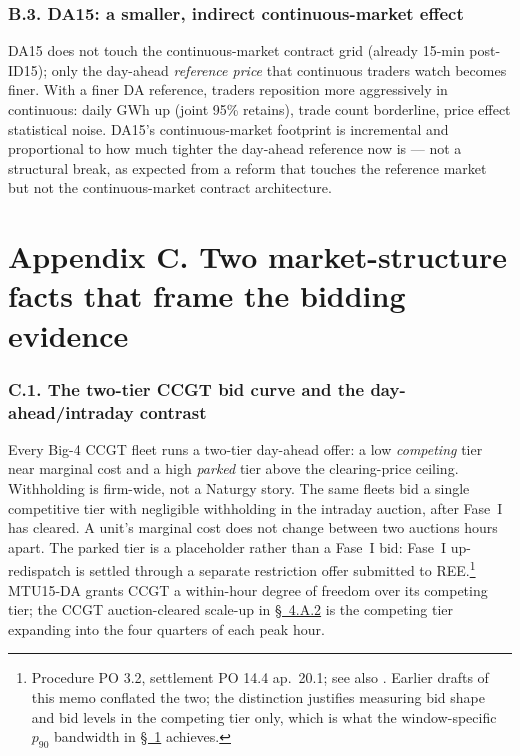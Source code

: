 \documentclass[11pt]{article}
\begin{document}
\subsubsection*{B.3. DA15: a smaller, indirect continuous-market effect}
DA15 does not touch the continuous-market contract grid (already 15-min post-ID15); only the day-ahead \emph{reference price} that continuous traders watch becomes finer. With a finer DA reference, traders reposition more aggressively in continuous: daily GWh up (joint 95\% retains), trade count borderline, price effect statistical noise. DA15's continuous-market footprint is incremental and proportional to how much tighter the day-ahead reference now is --- not a structural break, as expected from a reform that touches the reference market but not the continuous-market contract architecture.

\section*{Appendix C. Two market-structure facts that frame the bidding evidence}
\label{sec:context}

\subsubsection*{C.1. The two-tier CCGT bid curve and the day-ahead/intraday contrast}
Every Big-4 CCGT fleet runs a two-tier day-ahead offer: a low \emph{competing} tier near marginal cost and a high \emph{parked} tier above the clearing-price ceiling. Withholding is firm-wide, not a Naturgy story. The same fleets bid a single competitive tier with negligible withholding in the intraday auction, after Fase~I has cleared. A unit's marginal cost does not change between two auctions hours apart. The parked tier is a placeholder rather than a Fase~I bid: Fase~I up-redispatch is settled through a separate restriction offer submitted to REE.\footnote{Procedure PO 3.2, settlement PO 14.4 ap.~20.1; see also \citet{boe_a_2025_5342,boe_a_2025_13076}. Earlier drafts of this memo conflated the two; the distinction justifies measuring bid shape and bid levels in the competing tier only, which is what the window-specific $p_{90}$ bandwidth in \hyperref[sec:setup]{\S~1} achieves.} MTU15-DA grants CCGT a within-hour degree of freedom over its competing tier; the CCGT auction-cleared scale-up in \hyperref[sec:4iii]{\S~4.A.2} is the competing tier expanding into the four quarters of each peak hour.
\end{document}
